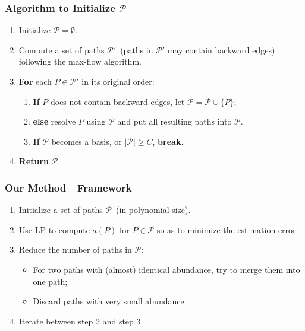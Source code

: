 \frame
{
	\frametitle{Algorithm to Initialize $\mathcal{P}$}

	\begin{enumerate}
	\item Initialize $\mathcal{P} = \emptyset$.
	\vspace{0.2cm}
	\item Compute a set of paths $\mathcal{P}'$~(paths in $\mathcal{P}'$ may contain backward edges) following the max-flow algorithm.
	\vspace{0.2cm}
	\item {\bf For} each $P\in\mathcal{P}'$ in its original order:
		\begin{enumerate}
		\vspace{0.1cm}
		\item {\bf If} $P$ does not contain backward edges, let $\mathcal{P} = \mathcal{P}\cup\{P\}$;
		\vspace{0.1cm}
		\item {\bf else} resolve $P$ using $\mathcal{P}$ and put all resulting paths into $\mathcal{P}$.
		\vspace{0.1cm}
		\item {\bf If} $\mathcal{P}$ becomes a basis, or $|\mathcal{P}| \ge C$, {\bf break}.
		\end{enumerate}
	\vspace{0.2cm}
	\item {\bf Return} $\mathcal{P}$.
	\end{enumerate}
}

\frame
{
	\frametitle{Our Method---Framework}
	\begin{enumerate}
	\item Initialize a set of paths $\mathcal{P}$~(in polynomial size).
	\vspace{0.2cm}
	\item Use LP to compute $a(P)$ for $P\in\mathcal{P}$ so as to minimize the estimation error.
	\vspace{0.2cm}
	\item Reduce the number of paths in $\mathcal{P}$:
		\begin{itemize}
		\vspace{0.1cm}
		\item For two paths with (almost) identical abundance, try to merge them into one path;
		\vspace{0.1cm}
		\item Discard paths with very small abundance.
		\end{itemize}
	\vspace{0.2cm}
	\item Iterate between step 2 and step 3.
	\end{enumerate}
}

